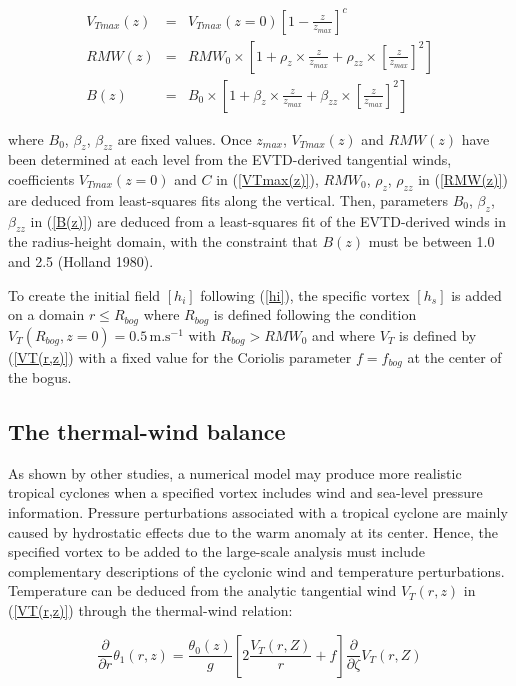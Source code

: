 \begin{eqnarray}
\label{VTmax(z)}
V_{Tmax}(z) &=& V_{Tmax}(z=0) \left[1-\frac{z}{z_{max}} \right]^c\\
\label{RMW(z)}
RMW(z) &=& RMW_{0}\times \left[1 +\rho_{z}\times \frac{z}{z_{max}}+\rho_{zz}\times \left[\frac{z}{z_{max}} \right]^2\right]\\
\label{B(z)}
B(z) &=& B_{0}\times\left[1 +\beta_{z}\times \frac{z}{z_{max}}+\beta_{zz}\times \left[\frac{z}{z_{max}} \right]^2\right]
\end{eqnarray}

where $B_{0}$, $\beta_{z}$, $\beta_{zz}$ are fixed values. Once $z_{max}$, $V_{Tmax}(z)$ and $RMW(z)$ have 
been determined at each level from the EVTD-derived tangential winds, coefficients 
$V_{Tmax}(z=0)$ and $C$ in (\ref{VTmax(z)}), $RMW_{0}$, $\rho_{z}$, $\rho_{zz}$ in (\ref{RMW(z)})
are deduced from least-squares fits along the vertical. Then, parameters $B_{0}$, $\beta_{z}$, $\beta_{zz}$ in (\ref{B(z)}) are deduced from a least-squares fit of the 
EVTD-derived winds in the radius-height domain, with the constraint that $B(z)$ must be 
between 1.0 and 2.5 (Holland 1980).

To create the initial field $[h_{i}]$ following (\ref{hi}), the specific vortex $[h_{s}]$ is added 
on a domain $r\le R_{bog}$ where $R_{bog}$ is defined following the condition $V_{T}(R_{bog},z=0)=0.5\,\mbox{m.s}^{-1}$ with $R_{bog}>RMW_0$ and where $V_{T}$ is defined by (\ref{VT(r,z)}) with a fixed value for the Coriolis parameter $f=f_{bog}$ at the center of the bogus.

\subsection{The thermal-wind balance}

As shown by other studies, a numerical model may produce more realistic tropical 
cyclones when a specified vortex includes wind and sea-level pressure information. 
Pressure perturbations associated with a tropical cyclone are mainly caused by 
hydrostatic effects due to the warm anomaly at its center. Hence, the specified 
vortex to be added to the large-scale analysis must include complementary descriptions 
of the cyclonic wind and temperature perturbations. Temperature can be deduced from 
the analytic tangential wind $V_{T}(r,z)$ in (\ref{VT(r,z)}) through the thermal-wind 
relation:

\begin{equation}
\frac{\partial}{\partial r}\theta_{1}(r,z)=\frac{\theta_{0}(z)}{g}\left[2\frac{V_{T}(r,Z)}{r}+f\right]\frac{\partial}{\partial\zeta}V_{T}(r,Z) 
\label{tempe_pert}
\end{equation}

